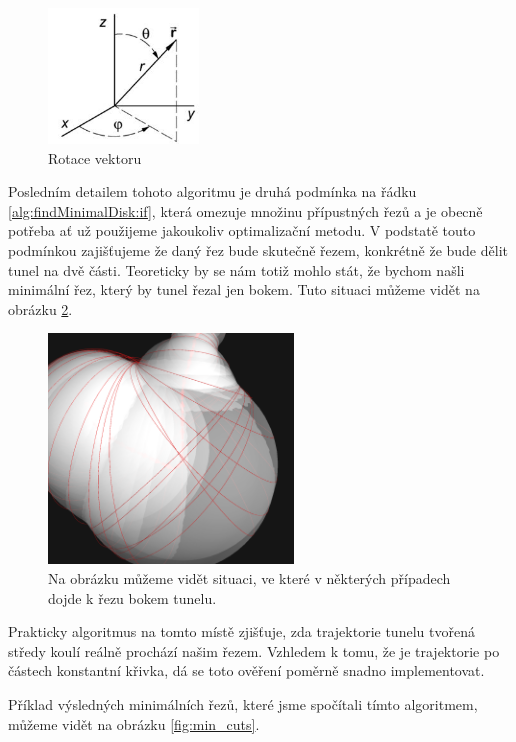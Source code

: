 \begin{figure}[ht]
    \centering
    \includegraphics[width=40mm]{img/vector_rotate.jpg}
    \caption{Rotace vektoru}
  \centering
  \label{fig:vector_rotate}
\end{figure}

Posledním detailem tohoto algoritmu je druhá podmínka na řádku \ref{alg:findMinimalDisk:if},
která omezuje množinu přípustných řezů a je obecně potřeba ať už použijeme
jakoukoliv optimalizační metodu. V podstatě touto podmínkou zajišťujeme že daný řez
bude skutečně řezem, konkrétně že bude dělit tunel na dvě části. Teoreticky by se nám
totiž mohlo stát, že bychom našli minimální řez, který by tunel řezal jen bokem.
Tuto situaci můžeme vidět na obrázku \ref{fig:side_cut}.

\begin{figure}[ht]
    \centering
    \includegraphics[width=65mm]{img/side_cut.png}
    \caption{Na obrázku můžeme vidět situaci, ve které v některých případech dojde
        k řezu bokem tunelu.}
  \centering
  \label{fig:side_cut}
\end{figure}

Prakticky algoritmus na tomto místě zjišťuje, zda trajektorie tunelu tvořená středy
koulí reálně prochází našim řezem. Vzhledem k tomu, že je trajektorie po částech
konstantní křivka, dá se toto ověření poměrně snadno implementovat.

Příklad výsledných minimálních řezů, které jsme spočítali tímto algoritmem,
můžeme vidět na obrázku \ref{fig:min_cuts}.

